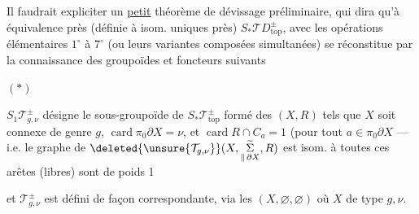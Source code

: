 
Il faudrait expliciter un \uline{petit} théorème de dévissage préliminaire, qui dira qu'à équivalence près (définie à isom. uniques près)
$S_*\mathcal TD_{\mathrm{top}}^\pm$,
avec les opérations élémentaires $1^\circ$ à $7^\circ$ (ou leurs variantes composées simultanées) se réconstitue par la connaissance des groupoïdes et foncteurs suivants


$(*)$\quad
{}
\deleted{\unsure{$\varnothing$}}

$S_1\mathcal T_{g,\nu}^\pm$ désigne le sous-groupoïde de $S_*\mathcal T_{\mathrm{top}}^\pm$ formé des $(X,R)$ tels que $X$ soit connexe de genre $g$, $\operatorname{card}\pi_0\partial X=\nu$, et $\operatorname{card}R\cap C_a=1$ (pour tout $a\in\pi_0\partial X$ --- i.e. le graphe  de
$\deleted{\unsure{\mathcal T_{g,\nu}}}(X,\underset{\Vert\,\partial X}{\widetilde\Sigma},R)$ est isom. à
toutes ces arêtes (libres) sont de poids 1

et $\mathcal T_{g,\nu}^\pm$ est défini de façon correspondante, via les $(X,\varnothing,\varnothing)$ où $X$ de type $g,\nu$.

